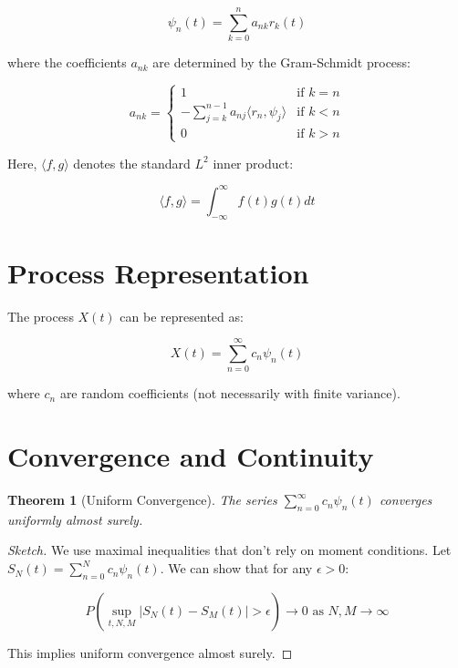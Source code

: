\documentclass{article}
\newtheorem{theorem}{Theorem}
\begin{document}
\begin{equation}
\psi_n(t) = \sum_{k=0}^n a_{nk} r_k(t)
\end{equation}

where the coefficients $a_{nk}$ are determined by the Gram-Schmidt process:

\begin{equation}
a_{nk} = \begin{cases}
1 & \text{if } k = n \\
-\sum_{j=k}^{n-1} a_{nj} \langle r_n, \psi_j \rangle & \text{if } k < n \\
0 & \text{if } k > n
\end{cases}
\end{equation}

Here, $\langle f, g \rangle$ denotes the standard $L^2$ inner product:

\begin{equation}
\langle f, g \rangle = \int_{-\infty}^{\infty} f(t) g(t) dt
\end{equation}

\section{Process Representation}

The process $X(t)$ can be represented as:

\begin{equation}
X(t) = \sum_{n=0}^{\infty} c_n \psi_n(t)
\end{equation}

where $c_n$ are random coefficients (not necessarily with finite variance).

\section{Convergence and Continuity}

\begin{theorem}[Uniform Convergence]
The series $\sum_{n=0}^{\infty} c_n \psi_n(t)$ converges uniformly almost surely.
\end{theorem}

\begin{proof}[Sketch]
We use maximal inequalities that don't rely on moment conditions. Let $S_N(t) = \sum_{n=0}^N c_n \psi_n(t)$. We can show that for any $\epsilon > 0$:

\[ P(\sup_{t,N,M} |S_N(t) - S_M(t)| > \epsilon) \to 0 \text{ as } N,M \to \infty \]

This implies uniform convergence almost surely.
\end{proof}
\end{document}
